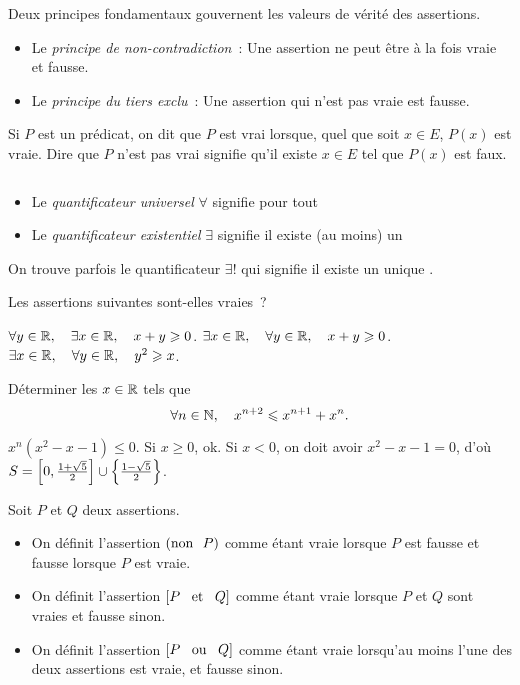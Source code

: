 \documentclass{magnolia}
\begin{document}
\begin{remarques}
\remarque Deux principes fondamentaux gouvernent les valeurs de vérité des assertions.
  \begin{itemize}
  \item Le \emph{principe de non-contradiction}~: Une assertion ne peut être à la fois vraie et fausse.
  \item Le \emph{principe du tiers exclu}~: Une assertion qui n'est pas vraie est fausse.
  \end{itemize}
\remarque Si $P$ est un prédicat, on dit que $P$ est vrai lorsque, quel que
  soit $x\in E$, $P(x)$ est vraie. Dire que $P$ n'est pas vrai
  signifie qu'il existe $x\in E$ tel que $P(x)$ est faux.
\end{remarques}

\begin{definition}[utile=-3]
$\quad$
\begin{itemize}
\item Le \emph{quantificateur universel} $\forall$ signifie \og pour tout \fg
\item Le \emph{quantificateur existentiel} $\exists$ signifie \og il existe (au moins) un \fg
\end{itemize}
\end{definition}

\begin{remarqueUnique}
\remarque On trouve parfois le quantificateur $\exists !$ qui signifie
  \og il existe un unique \fg. 
\end{remarqueUnique}

\begin{exos}
\exo Les assertions suivantes sont-elles vraies~?
  \begin{questions}
  \question $\forall y\in\mathbb{R} ,\quad \exists x\in\mathbb{R} ,\quad x+y\geqslant 0$.
  \question $\exists x\in\mathbb{R} ,\quad \forall y\in\mathbb{R} ,\quad x+y\geqslant 0$.
  \question $\exists x\in\mathbb{R} ,\quad \forall y\in\mathbb{R} ,\quad y^2\geqslant x$.
  \end{questions}
\exo Déterminer les $x\in\mathbb{R}$ tels que
  \[\forall n\in\mathbb{N} ,\quad x^{n+2}\leqslant x^{n+1}+x^n.\]
\end{exos}

\begin{sol}
$x^n(x^2-x-1)\leq 0$. Si $x\geq 0$, ok.
Si $x<0$, on doit avoir $x^2-x-1=0$, d'où $S= \left[0,\frac{1+\sqrt{5}}{2}\right]\cup\left\{\frac{1-\sqrt{5}}{2}\right\}$.
\end{sol}

\begin{definition}[utile=-3]
Soit $P$ et $Q$ deux assertions.
\begin{itemize}
\item On définit l'assertion $\left({\rm non}\ \  P\right)$ comme étant vraie
  lorsque $P$ est fausse et fausse lorsque $P$ est vraie.
\item On définit l'assertion $\left[P \quad\!\text{et}\quad\! Q\right]$ comme étant vraie
  lorsque $P$ et $Q$ sont vraies et fausse sinon.
\item On définit l'assertion $\left[P \quad\!\text{ou}\quad\! Q\right]$ comme étant vraie
  lorsqu'au moins l'une des deux assertions est vraie, et fausse sinon.
\end{itemize}
\end{definition}
\end{document}
